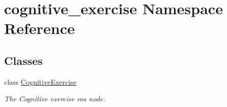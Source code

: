 \hypertarget{namespacecognitive__exercise}{\section{cognitive\-\_\-exercise Namespace Reference}
\label{namespacecognitive__exercise}
}
\subsection*{Classes}
\begin{DoxyCompactItemize}
\item 
class \hyperlink{classcognitive__exercise_1_1CognitiveExercise}{Cognitive\-Exercise}
\begin{DoxyCompactList}\small\item\em The Cognitive exercise ros node. \end{DoxyCompactList}\end{DoxyCompactItemize}
